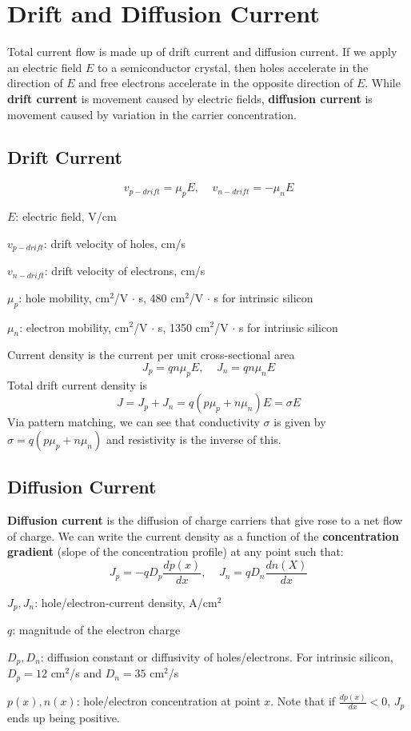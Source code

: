 \section{Drift and Diffusion Current}
Total current flow is made up of drift current and diffusion current. If we apply an electric field $E$ to a semiconductor crystal, then holes accelerate in the direction of $E$ and free electrons accelerate in the opposite direction of $E$. While \textbf{drift current} is movement caused by electric fields, \textbf{diffusion current} is movement caused by variation in the carrier concentration. 

\subsection{Drift Current}
    \[v_{p-drift} = \mu_p E, ~~~~~ v_{n-drift} = - \mu_n E\]

\begin{gline}
    \item $E$: electric field, V/cm
    \item $v_{p-drift}$: drift velocity of holes, cm/s
    \item $v_{n-drift}$: drift velocity of electrons, cm/s
    \item $\mu_p$: hole mobility, cm$^2$/V $\cdot$ s, 480 cm$^2$/V $\cdot$ s for intrinsic silicon
    \item $\mu_n$: electron mobility, cm$^2$/V $\cdot$ s, 1350 cm$^2$/V $\cdot$ s for intrinsic silicon
\end{gline}

Current density is the current per unit cross-sectional area
    \[J_p = qn\mu_p E, ~~~~~ J_n = qn\mu_n E\]
Total drift current density is
    \[J = J_p + J_n = q(p\mu_p + n\mu_n) E = \sigma E\]
Via pattern matching, we can see that conductivity $\sigma$ is given by $\sigma = q(p\mu_p + n\mu_n)$ and resistivity is the inverse of this.

\subsection{Diffusion Current}
\textbf{Diffusion current} is the diffusion of charge carriers that give rose to a net flow of charge. We can write the current density as a function of the \textbf{concentration gradient} (slope of the concentration profile) at any point such that:
    \[J_p = -q D_p \frac{dp(x)}{dx}, ~~~~~ J_n = q D_n \frac{dn(X)}{dx}\]
\begin{gline}
    \item $J_p, J_n$: hole/electron-current density, A/cm$^2$
    \item $q$: magnitude of the electron charge
    \item $D_p, D_n$: diffusion constant or diffusivity of holes/electrons. For intrinsic silicon, $D_p = 12$ cm$^2$/s and $D_n = 35$ cm$^2$/s
    \item $p(x), n(x)$: hole/electron concentration at point $x$. Note that if $\frac{dp(x)}{dx} < 0$, $J_p$ ends up being positive.
\end{gline}

